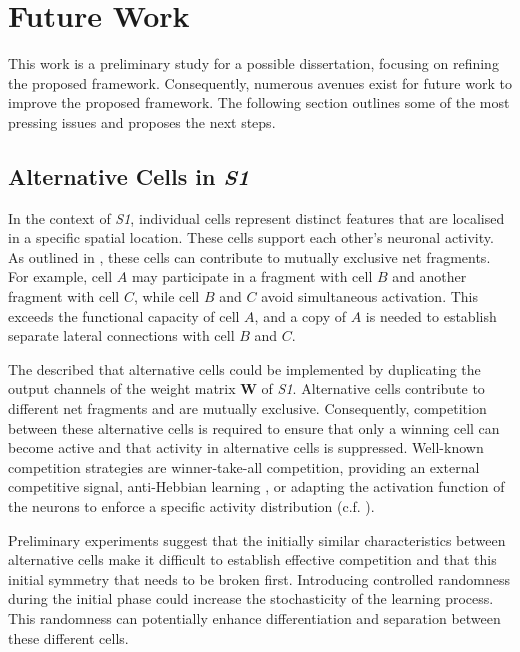 \section{Future Work}
This work is a preliminary study for a possible dissertation, focusing on refining the proposed framework.
Consequently, numerous avenues exist for future work to improve the proposed framework. The following section outlines some of the most pressing issues and proposes the next steps.


\subsection{Alternative Cells in \emph{S1}}
In the context of \emph{S1}, individual cells represent distinct features that are localised in a specific spatial location. These cells support each other's neuronal activity. As outlined in , these cells can contribute to mutually exclusive net fragments. For example, cell $A$ may participate in a fragment with cell $B$ and another fragment with cell $C$, while cell $B$ and $C$ avoid simultaneous activation. This exceeds the functional capacity of cell $A$, and a copy of $A$ is needed to establish separate lateral connections with cell $B$ and $C$.

The  described that alternative cells could be implemented by duplicating the output channels of the weight matrix $\boldsymbol{W}$ of \emph{S1}.
Alternative cells contribute to different net fragments and are mutually exclusive.
Consequently, competition between these alternative cells is required to ensure that only a winning cell can become active and that activity in alternative cells is suppressed.
Well-known competition strategies are winner-take-all competition, providing an external competitive signal, anti-Hebbian learning , or adapting the activation function of the neurons to enforce a specific activity distribution  (c.f. ).

Preliminary experiments suggest that the initially similar characteristics between alternative cells make it difficult to establish effective competition and that this initial symmetry that needs to be broken first.
Introducing controlled randomness during the initial phase could increase the stochasticity of the learning process. This randomness can potentially enhance differentiation and separation between these different cells.


